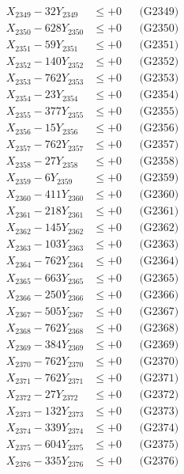 \documentclass[a4paper,10pt]{article}
\begin{document}
{\begin{align}
X_{2349} - 32Y_{2349} &\leq +0 && \text{(G2349)} \\
X_{2350} - 628Y_{2350} &\leq +0 && \text{(G2350)} \\
\allowbreak
X_{2351} - 59Y_{2351} &\leq +0 && \text{(G2351)} \\
X_{2352} - 140Y_{2352} &\leq +0 && \text{(G2352)} \\
X_{2353} - 762Y_{2353} &\leq +0 && \text{(G2353)} \\
X_{2354} - 23Y_{2354} &\leq +0 && \text{(G2354)} \\
X_{2355} - 377Y_{2355} &\leq +0 && \text{(G2355)} \\
X_{2356} - 15Y_{2356} &\leq +0 && \text{(G2356)} \\
X_{2357} - 762Y_{2357} &\leq +0 && \text{(G2357)} \\
X_{2358} - 27Y_{2358} &\leq +0 && \text{(G2358)} \\
X_{2359} - 6Y_{2359} &\leq +0 && \text{(G2359)} \\
X_{2360} - 411Y_{2360} &\leq +0 && \text{(G2360)} \\
\allowbreak
X_{2361} - 218Y_{2361} &\leq +0 && \text{(G2361)} \\
X_{2362} - 145Y_{2362} &\leq +0 && \text{(G2362)} \\
X_{2363} - 103Y_{2363} &\leq +0 && \text{(G2363)} \\
X_{2364} - 762Y_{2364} &\leq +0 && \text{(G2364)} \\
X_{2365} - 663Y_{2365} &\leq +0 && \text{(G2365)} \\
X_{2366} - 250Y_{2366} &\leq +0 && \text{(G2366)} \\
X_{2367} - 505Y_{2367} &\leq +0 && \text{(G2367)} \\
X_{2368} - 762Y_{2368} &\leq +0 && \text{(G2368)} \\
X_{2369} - 384Y_{2369} &\leq +0 && \text{(G2369)} \\
X_{2370} - 762Y_{2370} &\leq +0 && \text{(G2370)} \\
\allowbreak
X_{2371} - 762Y_{2371} &\leq +0 && \text{(G2371)} \\
X_{2372} - 27Y_{2372} &\leq +0 && \text{(G2372)} \\
X_{2373} - 132Y_{2373} &\leq +0 && \text{(G2373)} \\
X_{2374} - 339Y_{2374} &\leq +0 && \text{(G2374)} \\
X_{2375} - 604Y_{2375} &\leq +0 && \text{(G2375)} \\
X_{2376} - 335Y_{2376} &\leq +0 && \text{(G2376)} \\

\end{align}}
\end{document}
